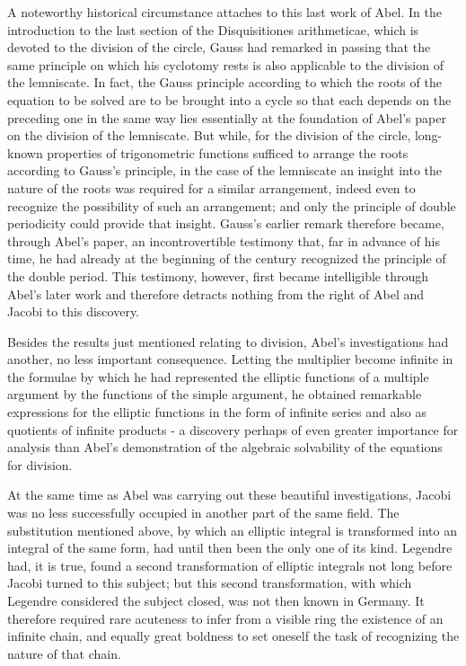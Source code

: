 \documentclass[11pt]{article}
\begin{document}
A noteworthy historical circumstance attaches to this last work of Abel. In the introduction to the last section of the Disquisitiones arithmeticae, which is devoted to the division of the circle, Gauss had remarked in passing that the same principle on which his cyclotomy rests is also applicable to the division of the lemniscate. In fact, the Gauss principle according to which the roots of the equation to be solved are to be brought into a cycle so that each depends on the preceding one in the same way lies essentially at the foundation of Abel's paper on the division of the lemniscate. But while, for the division of the circle, long-known properties of trigonometric functions sufficed to arrange the roots according to Gauss's principle, in the case of the lemniscate an insight into the nature of the roots was required for a similar arrangement, indeed even to recognize the possibility of such an arrangement; and only the principle of double periodicity could provide that insight. Gauss's earlier remark therefore became, through Abel's paper, an incontrovertible testimony that, far in advance of his time, he had already at the beginning of the century recognized the principle of the double period. This testimony, however, first became intelligible through Abel's later work and therefore detracts nothing from the right of Abel and Jacobi to this discovery.

Besides the results just mentioned relating to division, Abel's investigations had another, no less important consequence. Letting the multiplier become infinite in the formulae by which he had represented the elliptic functions of a multiple argument by the functions of the simple argument, he obtained remarkable expressions for the elliptic functions in the form of infinite series and also as quotients of infinite products - a discovery perhaps of even greater importance for analysis than Abel's demonstration of the algebraic solvability of the equations for division.

At the same time as Abel was carrying out these beautiful investigations, Jacobi was no less successfully occupied in another part of the same field. The substitution mentioned above, by which an elliptic integral is transformed into an integral of the same form, had until then been the only one of its kind. Legendre had, it is true, found a second transformation of elliptic integrals not long before Jacobi turned to this subject; but this second transformation, with which Legendre considered the subject closed, was not then known in Germany. It therefore required rare acuteness to infer from a visible ring the existence of an infinite chain, and equally great boldness to set oneself the task of recognizing the nature of that chain.
\end{document}
